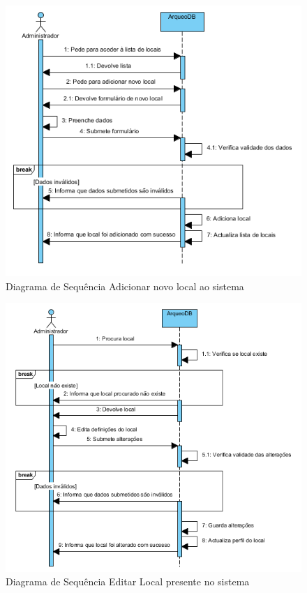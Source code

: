 ﻿\documentclass[12pt,a4paper]{article}
\begin{document}
\begin{figure}[h!]
\centering
\includegraphics[scale=1]{sequencia/A_adicionarlocal}
\caption{Diagrama de Sequência Adicionar novo local ao sistema} 
\end{figure}  

\begin{figure}[h!]
\centering
\includegraphics[scale=1]{sequencia/A_editarlocal}
\caption{Diagrama de Sequência Editar Local presente no sistema} 
\end{figure}  
\end{document}
